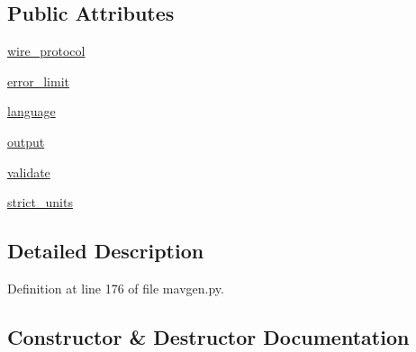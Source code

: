 \subsection*{Public Attributes}
\begin{DoxyCompactItemize}
\item 
\mbox{\hyperlink{classpymavlink_1_1generator_1_1mavgen_1_1Opts_af1a93e2fc4904c4e01985743105599f3}{wire\+\_\+protocol}}
\item 
\mbox{\hyperlink{classpymavlink_1_1generator_1_1mavgen_1_1Opts_aa2928bf27412e4e9c0e58c74268321d1}{error\+\_\+limit}}
\item 
\mbox{\hyperlink{classpymavlink_1_1generator_1_1mavgen_1_1Opts_ae98d3c4280d0f15292776a6ad5b3fc0b}{language}}
\item 
\mbox{\hyperlink{classpymavlink_1_1generator_1_1mavgen_1_1Opts_aa171d220e26278a358d1808fe78e4a55}{output}}
\item 
\mbox{\hyperlink{classpymavlink_1_1generator_1_1mavgen_1_1Opts_a44cf03993910729c1748cce06e909e06}{validate}}
\item 
\mbox{\hyperlink{classpymavlink_1_1generator_1_1mavgen_1_1Opts_a53768c5e54dd92e2e66283b2b559f7b5}{strict\+\_\+units}}
\end{DoxyCompactItemize}


\subsection{Detailed Description}


Definition at line 176 of file mavgen.\+py.



\subsection{Constructor \& Destructor Documentation}
\mbox{\label{classpymavlink_1_1generator_1_1mavgen_1_1Opts_a372b458daea9975d7069803324cbb6ee}} 
